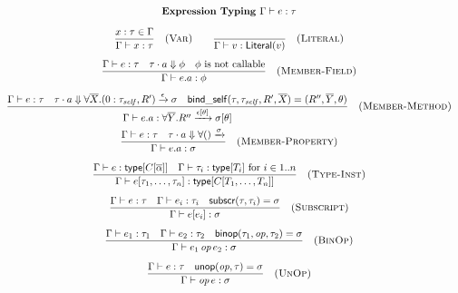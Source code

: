 \begin{figure*}[t]
\centering
\[
\begin{array}{c}
\textbf{Expression Typing } \Gamma \vdash e : \tau \\[1em]

\displaystyle\frac{x : \tau \in \Gamma}{\Gamma \vdash x : \tau} \quad \textsc{(Var)}
\qquad
\displaystyle\frac{}{\Gamma \vdash v : \mathsf{Literal}(v)} \quad \textsc{(Literal)}
\\[1.5em]

\displaystyle\frac{\Gamma \vdash e : \tau \quad \tau \cdot a \Downarrow \phi \quad \phi \text{ is not callable}}{\Gamma \vdash e.a : \phi} \quad \textsc{(Member-Field)}
\\[1.5em]

\displaystyle\frac{\Gamma \vdash e : \tau \quad \tau \cdot a \Downarrow \forall\overline{X}.(0:\tau_{\mathit{self}}, R') \xrightarrow{\epsilon} \sigma \quad \mathsf{bind\_self}(\tau, \tau_{\mathit{self}}, R', \overline{X}) = (R'', \overline{Y}, \theta)}{\Gamma \vdash e.a : \forall\overline{Y}.R'' \xrightarrow{\epsilon[\theta]} \sigma[\theta]} \quad \textsc{(Member-Method)}
\\[1.5em]

\displaystyle\frac{\Gamma \vdash e : \tau \quad \tau \cdot a \Downarrow \forall() \xrightarrow \sigma}{\Gamma \vdash e.a : \sigma} \quad \textsc{(Member-Property)}
\\[1.5em]

\displaystyle\frac{\Gamma \vdash e : \mathsf{type}[C[\overline{\alpha}]] \quad \Gamma \vdash \tau_i : \mathsf{type}[T_i] \text{ for } i \in 1..n}{\Gamma \vdash e[\tau_1, \ldots, \tau_n] : \mathsf{type}[C[T_1, \ldots, T_n]]} \quad \textsc{(Type-Inst)}
\\[1.5em]

\displaystyle\frac{\Gamma \vdash e : \tau \quad \Gamma \vdash e_i : \tau_i \quad \mathsf{subscr}(\tau, \tau_i) = \sigma}{\Gamma \vdash e[e_i] : \sigma} \quad \textsc{(Subscript)}
\\[1.5em]

\displaystyle\frac{\Gamma \vdash e_1 : \tau_1 \quad \Gamma \vdash e_2 : \tau_2 \quad \mathsf{binop}(\tau_1, \mathit{op}, \tau_2) = \sigma}{\Gamma \vdash e_1 \mathit{\,op\,} e_2 : \sigma} \quad \textsc{(BinOp)}
\\[1.5em]

\displaystyle\frac{\Gamma \vdash e : \tau \quad \mathsf{unop}(\mathit{op}, \tau) = \sigma}{\Gamma \vdash \mathit{op}\, e : \sigma} \quad \textsc{(UnOp)}
\\[2em]


\end{array}\]
\end{figure*}
